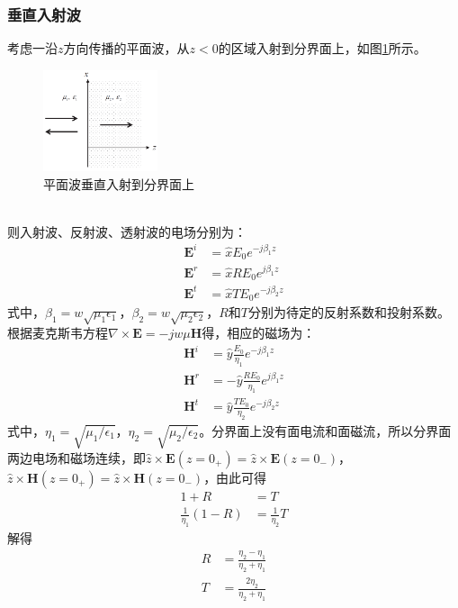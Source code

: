 \documentclass{article}
\numberwithin{equation}{section}
\begin{document}
\subsubsection{垂直入射波}
考虑一沿$z$方向传播的平面波，从$z<0$的区域入射到分界面上，如图\ref{fig:fig43}所示。
\begin{figure}[ht]
    \centering
    \includegraphics[width=0.3\textwidth]{平面波垂直入射到分界面上.PNG}
    \caption{平面波垂直入射到分界面上}
    \label{fig:fig43}
\end{figure}
\\
则入射波、反射波、透射波的电场分别为：
\begin{align}
    \label{eq:eq383}
    \mathbf{E}^i&=\hat{x}E_0e^{-j\beta_1z} \\
    \label{eq:eq384}
    \mathbf{E}^r&=\hat{x}RE_0e^{j\beta_1z} \\
    \label{eq:eq385}
    \mathbf{E}^t&=\hat{x}TE_0e^{-j\beta_2z}
\end{align}
式中，$\beta_1=w\sqrt{\mu_1\epsilon_1}$，$\beta_2=w\sqrt{\mu_2\epsilon_2}$，$R$和$T$分别为待定的反射系数和投射系数。根据麦克斯韦方程$\nabla\times\mathbf{E}=-jw\mu\mathbf{H}$得，相应的磁场为：
\begin{align}
    \label{eq:eq386}
    \mathbf{H}^i&=\hat{y}\frac{E_0}{\eta_1}e^{-j\beta_1z} \\
    \label{eq:eq387}
    \mathbf{H}^r&=-\hat{y}\frac{RE_0}{\eta_1}e^{j\beta_1z} \\
    \label{eq:eq388}
    \mathbf{H}^t&=\hat{y}\frac{TE_0}{\eta_2}e^{-j\beta_2z}
\end{align}
式中，$\eta_1=\sqrt{\mu_1/\epsilon_1}$，$\eta_2=\sqrt{\mu_2/\epsilon_2}$。分界面上没有面电流和面磁流，所以分界面两边电场和磁场连续，即$\hat{z}\times\mathbf{E}(z=0_+)=\hat{z}\times\mathbf{E}(z=0_-)$，$\hat{z}\times\mathbf{H}(z=0_+)=\hat{z}\times\mathbf{H}(z=0_-)$，由此可得
\begin{align}
    \label{eq:eq389}
    1+R&=T \\
    \label{eq:eq390}
    \frac{1}{\eta_1}(1-R)&=\frac{1}{\eta_2}T
\end{align}
解得
\begin{align}
    \label{eq:eq391}
    R&=\frac{\eta_2-\eta_1}{\eta_2+\eta_1} \\
    \label{eq:eq392}
    T&=\frac{2\eta_2}{\eta_2+\eta_1}
\end{align}
\end{document}
